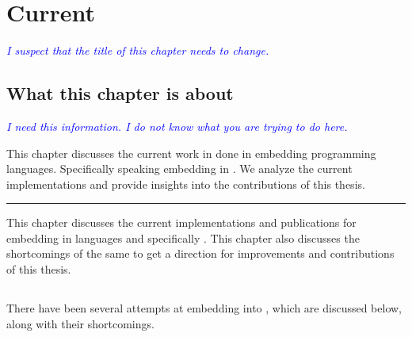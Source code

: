 \documentclass[thesis-solanki.tex]{subfiles}
\begin{document}
\chapter{Current}\label{chap:proposedWork}

\textcolor{blue}{\textsl{I suspect that the title of this chapter needs to change.}}

\section{What this chapter is about}\label{sec:what-this-chapter:proposedWork}

\textcolor{blue}{\textsl{I need this information.
    I do not know what you are trying to do here.
}}

This chapter discusses the current work in done in embedding programming languages.
Specifically speaking embedding  in .
We analyze the current implementations and provide insights into the contributions of this thesis.

\noindent\rule{\textwidth}{0.5pt}

This chapter discusses the current implementations and publications for embedding  in languages and specifically 
. This chapter also discusses the shortcomings of the same to get a direction for improvements and contributions of this 
thesis. 

\section{} \label{sec:existing-work-by-others}

There have been several attempts at embedding  into , which are
discussed below, along with their shortcomings.
\end{document}

